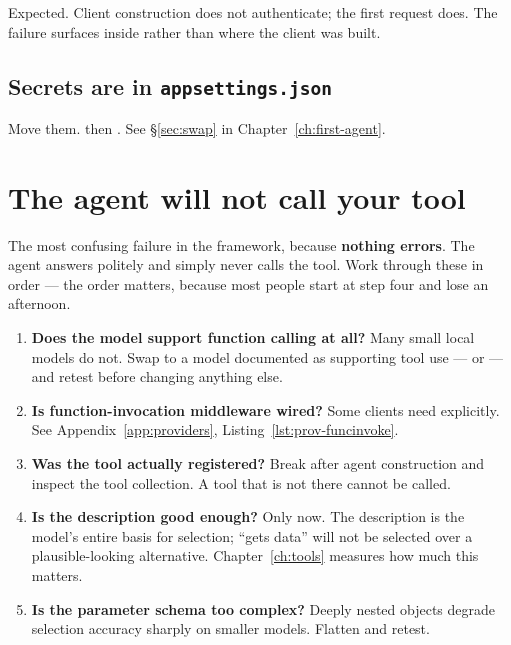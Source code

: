 Expected. Client construction does not authenticate; the first request does. The
failure surfaces inside  rather than where the client was built.

\subsection{Secrets are in \texttt{appsettings.json}}

Move them.  then .
See \S\ref{sec:swap} in Chapter~\ref{ch:first-agent}.

\section{The agent will not call your tool}
\label{sec:tb-no-tool-call}

The most confusing failure in the framework, because \textbf{nothing errors}. The
agent answers politely and simply never calls the tool. Work through these in
order --- the order matters, because most people start at step four and lose an
afternoon.

\begin{enumerate}[leftmargin=1.4em]
\item \textbf{Does the model support function calling at all?} Many small local
      models do not. Swap to a model documented as supporting tool use ---
       or  --- and retest before changing anything
      else.
\item \textbf{Is function-invocation middleware wired?} Some clients need
       explicitly. See
      Appendix~\ref{app:providers}, Listing~\ref{lst:prov-funcinvoke}.
\item \textbf{Was the tool actually registered?} Break after agent construction
      and inspect the tool collection. A tool that is not there cannot be called.
\item \textbf{Is the description good enough?} Only now. The description is the
      model's entire basis for selection; ``gets data'' will not be selected over
      a plausible-looking alternative. Chapter~\ref{ch:tools} measures how much
      this matters.
\item \textbf{Is the parameter schema too complex?} Deeply nested objects degrade
      selection accuracy sharply on smaller models. Flatten and retest.
\end{enumerate}

